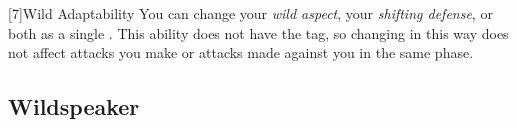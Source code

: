         [7]{Wild Adaptability} You can change your \textit{wild aspect}, your \textit{shifting defense}, or both as a single .
        This ability does not have the  tag, so changing in this way does not affect attacks you make or attacks made against you in the same phase.





    \newpage
    \subsection{Wildspeaker}\label{Wildspeaker}

